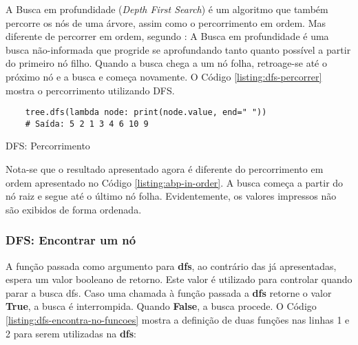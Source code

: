 A Busca em profundidade (\textit{Depth First Search}) é um algoritmo que também percorre os nós de uma árvore, assim como o percorrimento em ordem.
Mas diferente de percorrer em ordem, segundo \citeauthor{wiki_dfs}\cite{wiki_dfs}: A Busca em profundidade é uma busca não-informada que progride se
aprofundando tanto quanto possível a partir do primeiro nó filho. Quando a busca chega a um nó folha, retroage-se até o próximo nó e a busca e começa
novamente.
O Código \ref{listing:dfs-percorrer} mostra o percorrimento utilizando DFS.

\begin{listing}[!ht]
    \begin{verbatim}
    tree.dfs(lambda node: print(node.value, end=" "))
    # Saída: 5 2 1 3 4 6 10 9 
    \end{verbatim}
    \caption{DFS: Percorrimento}
    \label{listing:dfs-percorrer}
\end{listing}

Nota-se que o resultado apresentado agora é diferente do percorrimento em ordem apresentado no Código \ref{listing:abp-in-order}.
A busca começa a partir do nó raiz e segue até o último nó folha. Evidentemente, os valores impressos não são exibidos de forma ordenada.

\subsubsection{DFS: Encontrar um nó}

A função passada como argumento para \textbf{dfs}, ao contrário das já apresentadas, espera um valor booleano de retorno.
Este valor é utilizado para controlar quando parar a busca dfs. Caso uma chamada à função passada a \textbf{dfs}
retorne o valor \textbf{True}, a busca é interrompida. Quando \textbf{False}, a busca procede.\linebreak
O Código \ref{listing:dfs-encontra-no-funcoes} mostra a definição de duas funções nas linhas 1 e 2 para serem
utilizadas na \textbf{dfs}:

